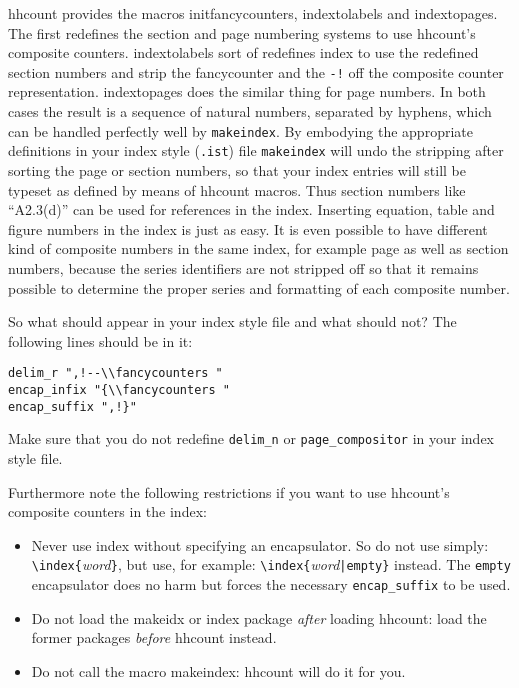 \documentclass[11pt]{article}
\makeatletter
\def\packagename#1{{\sffamily #1}}     %
\def\macroname#1{{\ttfamily\@ttbs#1}}  %
\def\hhcount{\packagename{hhcount}\xspace}
\def\={\verb=}
\def\<#1>{\macroname{#1}}
\makeatother
\begin{document}
\hhcount provides the macros \<initfancycounters>, \<indextolabels> and
\<indextopages>. The first redefines the section and page numbering
systems to use \hhcount's composite counters. \<indextolabels> sort of
redefines \<index> to use the redefined section numbers and strip the
\<fancycounter> and the \=-!= off the composite counter representation.
\<indextopages> does the similar thing for page numbers.
In both cases the result is a sequence of natural numbers,
separated by hyphens, which can be handled perfectly well by
{\tt makeindex}.
By embodying the appropriate definitions in your index style
(\hbox{\tt .ist}) file {\tt makeindex} will undo the stripping after
sorting the page or section numbers, so that your index entries will
still be typeset as defined by means of \hhcount macros. Thus section
numbers like ``A2.3(d)'' can be used for references in the index.
Inserting equation, table and figure numbers in the index is just as
easy. It is
even possible to have different kind of composite numbers in the
same index, for example page as well as section numbers, because
the series identifiers are not stripped off so that it remains possible
to determine the proper series and formatting of each composite number.

So what should appear in your index style file and what should not?
The following lines should be in it:
\begin{verbatim}
delim_r ",!--\\fancycounters "
encap_infix "{\\fancycounters "
encap_suffix ",!}"
\end{verbatim}
Make sure that you do not redefine \=delim_n= or
\=page_compositor= in your index style file.

Furthermore note the following restrictions if you want to
use \hhcount's composite counters in the index:\begin{itemize}
\item Never use \<index> without specifying an encapsulator.
      So do not use simply: \=\index{=\textit{word}\=}=, but
      use, for example: \=\index{=\textit{word}\=|empty}= instead.
      The \texttt{empty} encapsulator does no harm but forces
      the necessary \=encap_suffix= to be used.
\item Do not load the \packagename{makeidx} or \packagename{index}
      package \textit{after} loading \hhcount: load the former packages
      \textit{before} \hhcount instead.
\item Do not call the macro \<makeindex>: \hhcount will do it for you.
\end{itemize}
\end{document}
